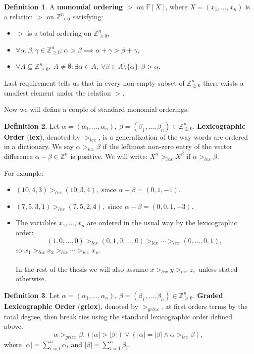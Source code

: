 \documentclass[thesis=M,english]{FITthesis}[2012/10/20]
\theoremstyle{remark}
\theoremstyle{definition}
\newtheorem{DF}{Definition}[section]
\begin{document}
\begin{DF}
A \textbf{monomial ordering} $>$ on $\mathbb{F}[X]$, where $X = (x_1, \ldots, x_n)$ is a relation $>$ on $\mathbb{Z}_{\geq 0}^n$ satisfying:
\begin{itemize}
\item $>$ is a total ordering on $\mathbb{Z}_{\geq 0}^n$,
\item $\forall \alpha, \beta, \gamma \in \mathbb{Z}_{\geq 0}^n: \alpha > \beta \implies \alpha + \gamma > \beta + \gamma,$
\item $\forall A \subseteq \mathbb{Z}_{\geq 0}^n,\ A \neq \emptyset: \exists \alpha \in A,\ \forall \beta \in A \setminus \{\alpha \}: \beta > \alpha.$ 
\end{itemize}
\noindent Last requirement tells us that in every non-empty subset of $\mathbb{Z}_{\geq 0}^n$ there exists a smallest element under the relation $>$.
\end{DF}
\phantom{.}
\phantom{.}
\noindent Now we will define a couple of standard monomial orderings.
\begin{DF}
Let $\alpha = (\alpha_1, \ldots, \alpha_n),\ \beta = (\beta_1, \ldots, \beta_n)\in \mathbb{Z}_{\geq 0}^n.$ \textbf{Lexicographic Order} (\textbf{lex}), denoted by $>_{lex}$, is a generalization of the way words are ordered in a dictionary. We say $\alpha >_{lex} \beta$ if the leftmost non-zero entry of the vector difference $\alpha - \beta \in \mathbb{Z}^n$ is positive. We will write: $X^\alpha >_{lex} X^\beta$ if $\alpha >_{lex} \beta$.
\end{DF}
For example:
\begin{itemize}
\item $(10,4,3) >_{lex} (10, 3, 4),$ since $\alpha - \beta = (0,1,-1)$.
\item $(7,5,3,1) >_{lex} (7, 5, 2, 4),$ since $\alpha - \beta = (0,0,1,-3)$.
\item The variables $x_1,\ldots,x_n$ are ordered in the usual way by the lexicographic order:
$$
(1,0,\ldots,0) >_{lex} (0,1,0,\ldots, 0) >_{lex} \cdots >_{lex} (0, \ldots, 0, 1),
$$
so $x_1 >_{lex} x_2 >_{lex} \cdots >_{lex} x_n.$ \\ \\
In the rest of the thesis we will also assume $x >_{lex} y >_{lex} z,$ unless stated otherwise.
\end{itemize} 
\begin{DF}
Let $\alpha = (\alpha_1, \ldots, \alpha_n),\ \beta = (\beta_1, \ldots, \beta_n)\in \mathbb{Z}_{\geq 0}^n.$ \textbf{Graded Lexicographic Order} (\textbf{grlex}), denoted by $>_{grlex}$, at first orders terms by the total degree, then break ties using the standard lexicographic order defined above. 
$$
\alpha >_{grlex} \beta: (|\alpha| > |\beta|) \lor (|\alpha| = |\beta| \land \alpha >_{lex} \beta),
$$
where $|\alpha| = \sum_{i=1}^n \alpha_i$ and $|\beta| = \sum_{i=1}^n \beta_i$.
\end{DF}
\end{document}
